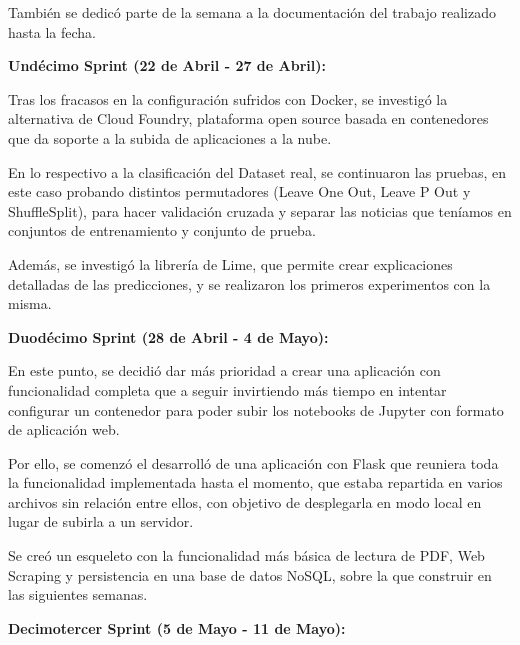 También se dedicó parte de la semana a la documentación del trabajo realizado hasta la fecha.



\textbf{Undécimo Sprint (22 de Abril - 27 de Abril):}

Tras los fracasos en la configuración sufridos con Docker, se investigó la alternativa de Cloud Foundry, plataforma open source basada en contenedores que da soporte a la subida de aplicaciones a la nube.

En lo respectivo a la clasificación del Dataset real, se continuaron las pruebas, en este caso probando distintos permutadores (Leave One Out, Leave P Out y ShuffleSplit), para hacer validación cruzada y separar las noticias que teníamos en conjuntos de entrenamiento y conjunto de prueba. 

Además, se investigó la librería de Lime, que permite crear explicaciones detalladas de las predicciones, y se realizaron los primeros experimentos con la misma.



\textbf{Duodécimo Sprint (28 de Abril - 4 de Mayo):}

En este punto, se decidió dar más prioridad a crear una aplicación con funcionalidad completa que a seguir invirtiendo más tiempo en intentar configurar un contenedor para poder subir los notebooks de Jupyter con formato de aplicación web. 

Por ello, se comenzó el desarrolló de una aplicación con Flask que reuniera toda la funcionalidad implementada hasta el momento, que estaba repartida en varios archivos sin relación entre ellos, con objetivo de desplegarla en modo local en lugar de subirla a un servidor. 

Se creó un esqueleto con la funcionalidad más básica de lectura de PDF, Web Scraping y persistencia en una base de datos NoSQL, sobre la que construir en las siguientes semanas.



\textbf{Decimotercer Sprint (5 de Mayo - 11 de Mayo):}

